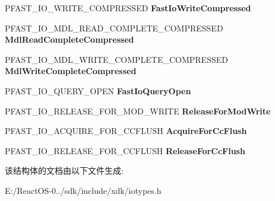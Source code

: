 \begin{DoxyCompactItemize}
P\+F\+A\+S\+T\+\_\+\+I\+O\+\_\+\+W\+R\+I\+T\+E\+\_\+\+C\+O\+M\+P\+R\+E\+S\+S\+ED {\bfseries Fast\+Io\+Write\+Compressed}
\item 
\mbox{\label{struct___f_a_s_t___i_o___d_i_s_p_a_t_c_h_aac14c5424873e9752bafb09cacde25c7}} 
P\+F\+A\+S\+T\+\_\+\+I\+O\+\_\+\+M\+D\+L\+\_\+\+R\+E\+A\+D\+\_\+\+C\+O\+M\+P\+L\+E\+T\+E\+\_\+\+C\+O\+M\+P\+R\+E\+S\+S\+ED {\bfseries Mdl\+Read\+Complete\+Compressed}
\item 
\mbox{\label{struct___f_a_s_t___i_o___d_i_s_p_a_t_c_h_a2a2f6aaf55a709f4062d506d4a76f26e}} 
P\+F\+A\+S\+T\+\_\+\+I\+O\+\_\+\+M\+D\+L\+\_\+\+W\+R\+I\+T\+E\+\_\+\+C\+O\+M\+P\+L\+E\+T\+E\+\_\+\+C\+O\+M\+P\+R\+E\+S\+S\+ED {\bfseries Mdl\+Write\+Complete\+Compressed}
\item 
\mbox{\label{struct___f_a_s_t___i_o___d_i_s_p_a_t_c_h_ae2de0d8bba5a61cc3e217d96c9eb9635}} 
P\+F\+A\+S\+T\+\_\+\+I\+O\+\_\+\+Q\+U\+E\+R\+Y\+\_\+\+O\+P\+EN {\bfseries Fast\+Io\+Query\+Open}
\item 
\mbox{\label{struct___f_a_s_t___i_o___d_i_s_p_a_t_c_h_ac0a4de6af6e95c69e255e0fdf21d4936}} 
P\+F\+A\+S\+T\+\_\+\+I\+O\+\_\+\+R\+E\+L\+E\+A\+S\+E\+\_\+\+F\+O\+R\+\_\+\+M\+O\+D\+\_\+\+W\+R\+I\+TE {\bfseries Release\+For\+Mod\+Write}
\item 
\mbox{\label{struct___f_a_s_t___i_o___d_i_s_p_a_t_c_h_a506f6a2ac11f7aefa55277dd5ef32000}} 
P\+F\+A\+S\+T\+\_\+\+I\+O\+\_\+\+A\+C\+Q\+U\+I\+R\+E\+\_\+\+F\+O\+R\+\_\+\+C\+C\+F\+L\+U\+SH {\bfseries Acquire\+For\+Cc\+Flush}
\item 
\mbox{\label{struct___f_a_s_t___i_o___d_i_s_p_a_t_c_h_a1f39904594a9da45c532249b1850d896}} 
P\+F\+A\+S\+T\+\_\+\+I\+O\+\_\+\+R\+E\+L\+E\+A\+S\+E\+\_\+\+F\+O\+R\+\_\+\+C\+C\+F\+L\+U\+SH {\bfseries Release\+For\+Cc\+Flush}
\end{DoxyCompactItemize}


该结构体的文档由以下文件生成\+:\begin{DoxyCompactItemize}
\item 
E\+:/\+React\+O\+S-\/0../sdk/include/xdk/iotypes.\+h\end{DoxyCompactItemize}
